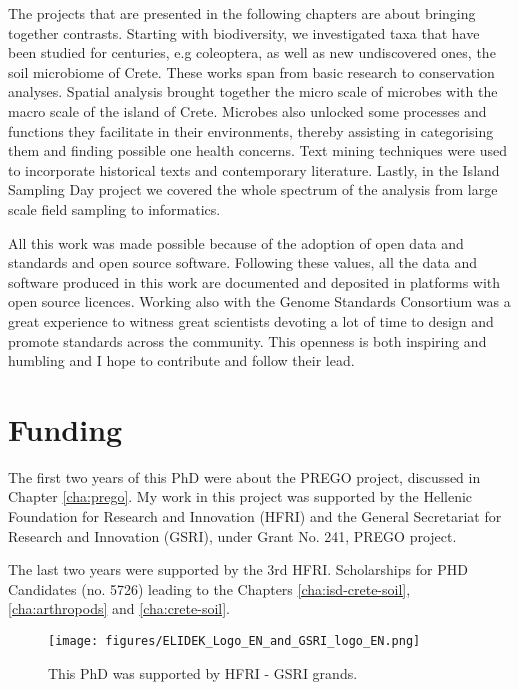 \documentclass[
11pt, %
english, %
singlespacing, %
liststotoc, %
toctotoc, %
headsepline, %
]{MastersDoctoralThesis} %
\begin{document}
The projects that are presented in the following chapters are about 
bringing together contrasts. Starting with biodiversity, we investigated taxa that 
have been studied for centuries, e.g coleoptera, as well as new undiscovered ones, the soil microbiome of 
Crete. These works span from basic research to conservation analyses. 
Spatial analysis brought together the micro scale of microbes with the macro
scale of the island of Crete.
Microbes also unlocked some processes and functions they facilitate in their environments, thereby assisting in
categorising them and finding possible one health concerns.
Text mining techniques were used to incorporate historical texts and contemporary literature.
Lastly, in the Island Sampling Day project we covered
the whole spectrum of the analysis from large scale field sampling to informatics.

All this work was made possible because of the adoption of open data and standards
and open source software. Following these values, all the data and software produced
in this work are documented and deposited in platforms with open source licences. 
Working also with the Genome Standards Consortium was a great experience to witness
great scientists devoting a lot of time to design and promote standards across the 
community. This openness is both inspiring and humbling and I hope to contribute and follow 
their lead.

\chapter*{Funding}

The first two years of this PhD were about the PREGO project, discussed in Chapter \ref{cha:prego}. My work in this 
project was supported by the Hellenic Foundation for Research and
Innovation (HFRI) and the General Secretariat for Research and Innovation (GSRI),
under Grant No. 241, PREGO project.

The last two years were supported by the 3rd HFRI. Scholarships for PHD
Candidates (no. 5726) leading to the Chapters \ref{cha:isd-crete-soil}, \ref{cha:arthropods} and \ref{cha:crete-soil}.

   \begin{figure}[h]
      \centering
      \texttt{[image: figures/ELIDEK\_Logo\_EN\_and\_GSRI\_logo\_EN.png]}
      \caption[HFRI and GSRI funding]{
          This PhD was supported by HFRI - GSRI grands. 
      }
      \label{fig:hfri_logo}
   \end{figure}
\end{document}
